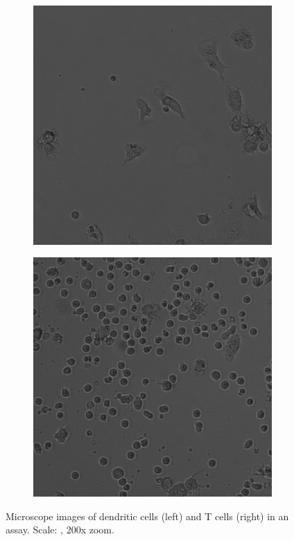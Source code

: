 \begin{figure}[h]
    \centering
    \begin{subfigure}[h!]{0.3\textwidth}
        \includegraphics[width=\textwidth]{dissertation/figures/example_DCs.png}
    \end{subfigure}
    \begin{subfigure}[h!]{0.3\textwidth}
        \includegraphics[width=\textwidth]{dissertation/figures/example_Tcells.png}
    \end{subfigure}
    \caption{Microscope images of dendritic cells (left) and T cells (right) in an assay. Scale: , 200x zoom.}
\end{figure}


